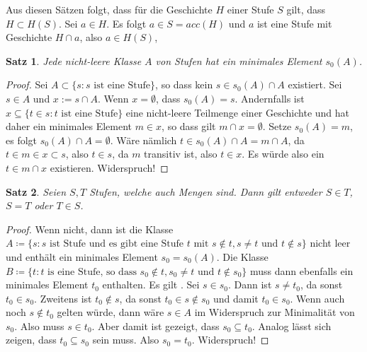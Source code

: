 \documentclass[german]{article}
\theoremstyle{break}
\theoremstyle{def_style}
\theoremstyle{def_style}
\newtheorem{satz}{Satz}[section]
\theoremstyle{lemma_style}
\begin{document}
Aus diesen Sätzen folgt, dass für die Geschichte $H$ einer Stufe $S$ gilt, dass $H \subset H(S)$. Sei $a\in H$. Es folgt $a\in S=acc(H)$ und $a$ ist eine Stufe mit Geschichte $H\cap a$, also $a\in H(S)$,

\begin{satz}
	Jede nicht-leere Klasse $A$ von Stufen hat ein minimales Element $s_0(A)$.
\end{satz}
\begin{proof}
	Sei $A\subset\{s : s \text{ ist eine Stufe}\}$, so dass kein $s\in s_0(A)\cap A$ existiert. Sei $s\in A$ und $x:=s\cap A$. Wenn $x=\emptyset$, dass $s_0(A)=s$. 
	Andernfalls ist $x\subseteq\{t \in s : t \text{ ist eine Stufe}\}$ eine nicht-leere Teilmenge einer Geschichte und hat daher ein minimales Element $m\in x$, so dass gilt $m\cap x = \emptyset$. 
	Setze $s_0(A)=m$, es folgt $s_0(A)\cap A=\emptyset$. Wäre nämlich $t \in s_0(A)\cap A=m\cap A$, da $t\in m \in x \subset s$, also $t \in s$, da $m$ transitiv ist, also $t\in x$. Es würde also ein $t\in m\cap x$ existieren. Widerspruch!
\end{proof}

\begin{satz}
	Seien $S, T$ Stufen, welche auch Mengen sind. Dann gilt entweder $S\in T$, $S=T$ oder $T \in S$.
\end{satz}
\begin{proof}
	Wenn nicht, dann ist die Klasse $A\coloneqq\{s : s \text{ ist Stufe und es gibt eine Stufe } t \text{ mit } s \notin t, s\neq t \text{ und } t \notin s\}$ nicht leer und enthält ein minimales Element $s_0=s_0(A)$. 
	Die Klasse $B\coloneqq\{t : t \text{ is eine Stufe, so dass } s_0 \notin t, s_0\neq t \text{ und } t \notin s_0\}$ muss dann ebenfalls ein minimales Element $t_0$ enthalten.
	Es gilt .
	Sei $s\in s_0$. Dann ist $s\neq t_0$, da sonst $t_0\in s_0$.
	Zweitens ist $t_0 \notin s$, da sonst $t_0\in s \notin s_0$ und damit $t_0\in s_0$.
	Wenn auch noch $s\notin t_0$ gelten würde, dann wäre $s\in A$ im Widerspruch zur Minimalität von $s_0$. Also muss $s\in t_0$. Aber damit ist gezeigt, dass $s_0\subseteq t_0$. Analog lässt sich zeigen, dass $t_0\subseteq s_0$ sein muss. Also $s_0=t_0$. Widerspruch!
\end{proof}
\end{document}
